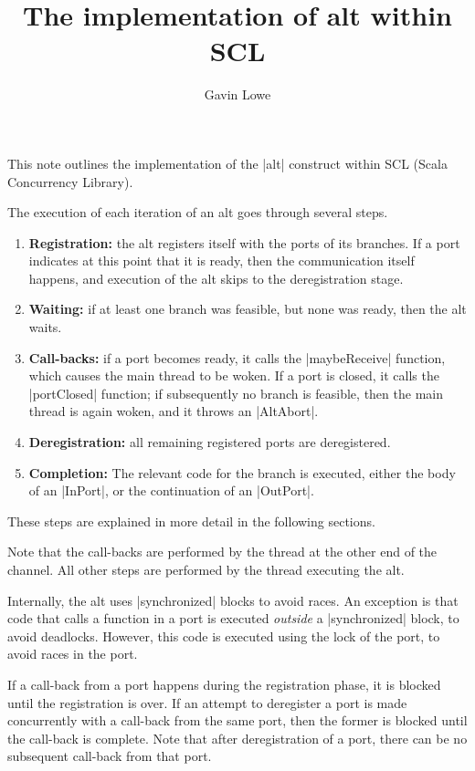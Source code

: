\documentclass[12pt,a4paper]{article}
\title{The implementation of {\scalashape alt} within SCL}
\author{Gavin Lowe}
\begin{document}
\maketitle

This note outlines the implementation of the |alt| construct within SCL (Scala
Concurrency Library). 

The execution of each iteration of an alt goes through several steps.
%
\begin{enumerate}
\item \textbf{Registration:} the alt registers itself with the ports of its
  branches.  If a port indicates at this point that it is ready, then the
  communication itself happens, and execution of the alt skips to the
  deregistration stage.
    
\item \textbf{Waiting:} if at least one branch was feasible, but none was
  ready, then the alt waits.
    
\item \textbf{Call-backs:} if a port becomes ready, it calls the
  |maybeReceive| function, which causes the main thread to be woken.  If a
  port is closed, it calls the |portClosed| function; if subsequently no
  branch is feasible, then the main thread is again woken, and it throws an
  |AltAbort|.
    
\item \textbf{Deregistration:} all remaining registered ports are
  deregistered.
    
\item \textbf{Completion:} The relevant code for the branch is executed,
  either the body of an |InPort|, or the continuation of an |OutPort|.
\end{enumerate}
%
These steps are explained in more detail in the following sections. 

Note that the call-backs are performed by the thread at the other end of the
channel.  All other steps are performed by the thread executing the alt.

Internally, the alt uses |synchronized| blocks to avoid races.  An exception
is that code that calls a function in a port is executed \emph{outside} a
|synchronized| block, to avoid deadlocks.  However, this code is executed
using the lock of the port, to avoid races in the port.  

If a call-back from a port happens during the registration phase, it is
blocked until the registration is over.  If an attempt to deregister a port is
made concurrently with a call-back from the same port, then the former is
blocked until the call-back is complete.  Note that after deregistration of a
port, there can be no subsequent call-back from that port.
\end{document}

